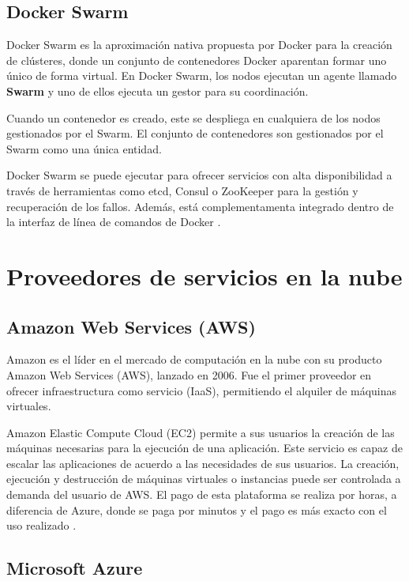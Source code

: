 \documentclass[11pt,spanish,listoffigures]{tfgetsinf}
\begin{document}
\subsection{Docker Swarm}

Docker Swarm es la aproximación nativa propuesta por Docker para la creación de clústeres, donde un conjunto de contenedores Docker aparentan formar uno único de forma virtual. En Docker Swarm, los nodos ejecutan un agente llamado \textbf{Swarm} y uno de ellos ejecuta un gestor para su coordinación.

Cuando un contenedor es creado, este se despliega en cualquiera de los nodos gestionados por el Swarm. El conjunto de contenedores son gestionados por el Swarm como una única entidad.

Docker Swarm se puede ejecutar para ofrecer servicios con alta disponibilidad a través de herramientas como etcd, Consul o ZooKeeper para la gestión y recuperación de los fallos. Además, está complementamenta integrado dentro de la interfaz de línea de comandos de Docker \cite{DeAlfonso2017}.

\section{Proveedores de servicios en la nube}

\subsection{Amazon Web Services (AWS)}
Amazon es el líder en el mercado de computación en la nube con su producto Amazon Web Services (AWS), lanzado en 2006. Fue el primer proveedor en ofrecer infraestructura como servicio (IaaS), permitiendo el alquiler de máquinas virtuales.

Amazon Elastic Compute Cloud (EC2) permite a sus usuarios la creación de las máquinas necesarias para la ejecución de una aplicación. Este servicio es capaz de escalar las aplicaciones de acuerdo a las necesidades de sus usuarios. La creación, ejecución y destrucción de máquinas virtuales o instancias puede ser controlada a demanda del usuario de AWS. El pago de esta plataforma se realiza por horas, a diferencia de Azure, donde se paga por minutos y el pago es más exacto con el uso realizado \cite{Qaisi2016}.

\subsection{Microsoft Azure}
\end{document}
